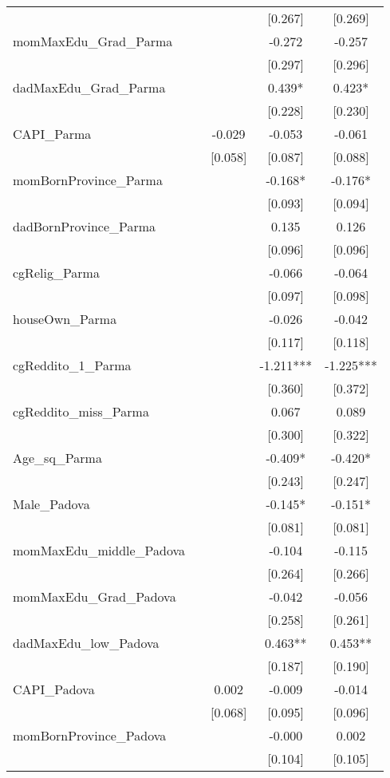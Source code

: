 \documentclass[]{article}
\begin{document}
\begin{tabular}{lcccc}
 &  &  & [0.267] & [0.269] \\
momMaxEdu\_Grad\_Parma &  &  & -0.272 & -0.257 \\
 &  &  & [0.297] & [0.296] \\
dadMaxEdu\_Grad\_Parma &  &  & 0.439* & 0.423* \\
 &  &  & [0.228] & [0.230] \\
CAPI\_Parma &  & -0.029 & -0.053 & -0.061 \\
 &  & [0.058] & [0.087] & [0.088] \\
momBornProvince\_Parma &  &  & -0.168* & -0.176* \\
 &  &  & [0.093] & [0.094] \\
dadBornProvince\_Parma &  &  & 0.135 & 0.126 \\
 &  &  & [0.096] & [0.096] \\
cgRelig\_Parma &  &  & -0.066 & -0.064 \\
 &  &  & [0.097] & [0.098] \\
houseOwn\_Parma &  &  & -0.026 & -0.042 \\
 &  &  & [0.117] & [0.118] \\
cgReddito\_1\_Parma &  &  & -1.211*** & -1.225*** \\
 &  &  & [0.360] & [0.372] \\
cgReddito\_miss\_Parma &  &  & 0.067 & 0.089 \\
 &  &  & [0.300] & [0.322] \\
Age\_sq\_Parma &  &  & -0.409* & -0.420* \\
 &  &  & [0.243] & [0.247] \\
Male\_Padova &  &  & -0.145* & -0.151* \\
 &  &  & [0.081] & [0.081] \\
momMaxEdu\_middle\_Padova &  &  & -0.104 & -0.115 \\
 &  &  & [0.264] & [0.266] \\
momMaxEdu\_Grad\_Padova &  &  & -0.042 & -0.056 \\
 &  &  & [0.258] & [0.261] \\
dadMaxEdu\_low\_Padova &  &  & 0.463** & 0.453** \\
 &  &  & [0.187] & [0.190] \\
CAPI\_Padova &  & 0.002 & -0.009 & -0.014 \\
 &  & [0.068] & [0.095] & [0.096] \\
momBornProvince\_Padova &  &  & -0.000 & 0.002 \\
 &  &  & [0.104] & [0.105] \\

\end{tabular}
\end{document}
